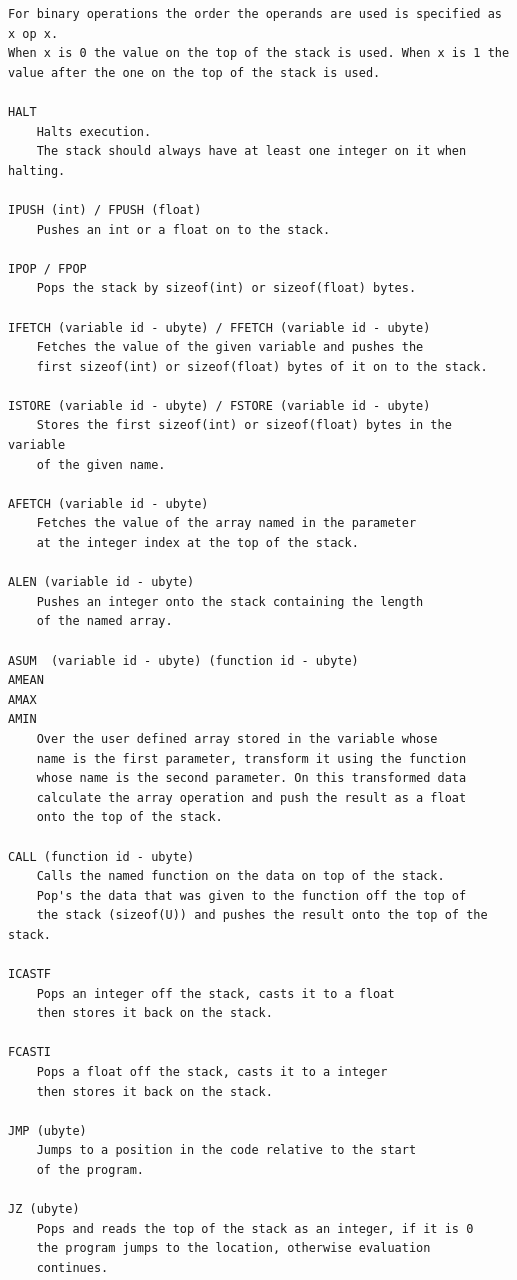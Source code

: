 \begin{lstlisting}[language=Dragon]
For binary operations the order the operands are used is specified as x op x.
When x is 0 the value on the top of the stack is used. When x is 1 the
value after the one on the top of the stack is used.

HALT
    Halts execution.
    The stack should always have at least one integer on it when halting.

IPUSH (int) / FPUSH (float)
    Pushes an int or a float on to the stack.

IPOP / FPOP
    Pops the stack by sizeof(int) or sizeof(float) bytes.

IFETCH (variable id - ubyte) / FFETCH (variable id - ubyte)
    Fetches the value of the given variable and pushes the
    first sizeof(int) or sizeof(float) bytes of it on to the stack.

ISTORE (variable id - ubyte) / FSTORE (variable id - ubyte)
    Stores the first sizeof(int) or sizeof(float) bytes in the variable
    of the given name.

AFETCH (variable id - ubyte)
    Fetches the value of the array named in the parameter
    at the integer index at the top of the stack.

ALEN (variable id - ubyte)
    Pushes an integer onto the stack containing the length
    of the named array.
	
ASUM  (variable id - ubyte) (function id - ubyte)
AMEAN
AMAX
AMIN
    Over the user defined array stored in the variable whose
    name is the first parameter, transform it using the function
    whose name is the second parameter. On this transformed data
    calculate the array operation and push the result as a float
    onto the top of the stack.

CALL (function id - ubyte)
    Calls the named function on the data on top of the stack.
    Pop's the data that was given to the function off the top of
    the stack (sizeof(U)) and pushes the result onto the top of the stack.

ICASTF
    Pops an integer off the stack, casts it to a float
    then stores it back on the stack.

FCASTI
    Pops a float off the stack, casts it to a integer
    then stores it back on the stack.

JMP (ubyte)
    Jumps to a position in the code relative to the start
    of the program.

JZ (ubyte)
    Pops and reads the top of the stack as an integer, if it is 0
    the program jumps to the location, otherwise evaluation
    continues.


\end{lstlisting}
